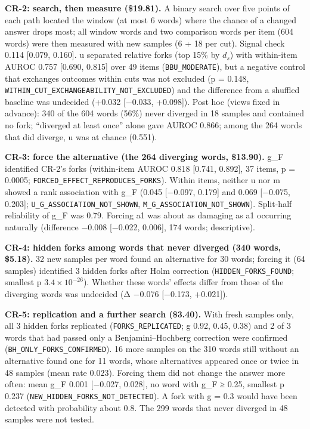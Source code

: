 \documentclass[
  10pt,
  a4paper,
]{article}
\begin{document}
\textbf{CR-2: search, then measure (\$19.81).} A binary search over five points of each path located the window (at most 6 words) where the chance of a changed answer drops most; all window words and
two comparison words per item (604 words) were then measured with new samples (6 + 18 per cut). Signal check 0.114 {[}0.079, 0.160{]}. u separated relative forks (top 15\% by \(d_{s}\)) with
within-item AUROC 0.757 {[}0.690, 0.815{]} over 49 items (\texttt{BBU\_\allowbreak{}MODERATE}), but a negative control that exchanges outcomes within cuts was not excluded (p = 0.148,
\texttt{WITHIN\_\allowbreak{}CUT\_\allowbreak{}EXCHANGEABILITY\_\allowbreak{}NOT\_\allowbreak{}EXCLUDED}) and the difference from a shuffled baseline was undecided (+0.032 {[}−0.033, +0.098{]}). Post hoc (views fixed in advance): 340 of the 604 words
(56\%) never diverged in 18 samples and contained no fork; ``diverged at least once'' alone gave AUROC 0.866; among the 264 words that did diverge, u was at chance (0.551).

\textbf{CR-3: force the alternative (the 264 diverging words, \$13.90).} g\_F identified CR-2's forks (within-item AUROC 0.818 {[}0.741, 0.892{]}, 37 items, p = 0.0005;
\texttt{FORCED\_\allowbreak{}EFFECT\_\allowbreak{}REPRODUCES\_\allowbreak{}FORKS}). Within items, neither u nor m showed a rank association with g\_F (0.045 {[}−0.097, 0.179{]} and 0.069 {[}−0.075, 0.203{]};
\texttt{U\_\allowbreak{}G\_\allowbreak{}ASSOCIATION\_\allowbreak{}NOT\_\allowbreak{}SHOWN}, \texttt{M\_\allowbreak{}G\_\allowbreak{}ASSOCIATION\_\allowbreak{}NOT\_\allowbreak{}SHOWN}). Split-half reliability of g\_F was 0.79. Forcing a1 was about as damaging as a1 occurring naturally (difference −0.008
{[}−0.022, 0.006{]}, 174 words; descriptive).

\textbf{CR-4: hidden forks among words that never diverged (340 words, \$5.18).} 32 new samples per word found an alternative for 30 words; forcing it (64 samples) identified 3 hidden forks after Holm
correction (\texttt{HIDDEN\_\allowbreak{}FORKS\_\allowbreak{}FOUND}; smallest p \(3.4\times 10^{-26}\)). Whether these words' effects differ from those of the diverging words was undecided (Δ −0.076 {[}−0.173, +0.021{]}).

\textbf{CR-5: replication and a further search (\$3.40).} With fresh samples only, all 3 hidden forks replicated (\texttt{FORKS\_\allowbreak{}REPLICATED}; g 0.92, 0.45, 0.38) and 2 of 3 words that had passed only
a Benjamini--Hochberg correction were confirmed (\texttt{BH\_\allowbreak{}ONLY\_\allowbreak{}FORKS\_\allowbreak{}CONFIRMED}). 16 more samples on the 310 words still without an alternative found one for 11 words, whose alternatives appeared
once or twice in 48 samples (mean rate 0.023). Forcing them did not change the answer more often: mean g\_F 0.001 {[}−0.027, 0.028{]}, no word with g\_F ≥ 0.25, smallest p 0.237
(\texttt{NEW\_\allowbreak{}HIDDEN\_\allowbreak{}FORKS\_\allowbreak{}NOT\_\allowbreak{}DETECTED}). A fork with g = 0.3 would have been detected with probability about 0.8. The 299 words that never diverged in 48 samples were not tested.
\end{document}
